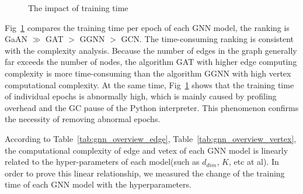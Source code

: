 \begin{figure}
    \caption{The impact of training time}
	\label{fig:exp_absolute_training_time}
\end{figure}

Fig~\ref{fig:exp_absolute_training_time} compares the training time per epoch of each GNN model, the ranking is GaAN $\gg$ GAT $>$ GGNN $>$ GCN.
The time-consuming ranking is consistent with the complexity analysis. Because the number of edges in the graph generally far exceeds the number of nodes, 
the algorithm GAT with higher edge computing complexity is more time-consuming than the algorithm GGNN with high vertex computational complexity. At the same time, 
Fig~\ref{fig:exp_absolute_training_time} shows that the training time of individual epochs is abnormally high, which is mainly caused by profiling overhead and the GC pause of the Python interpreter.
This phenomenon confirms the necessity of removing abnormal epochs.

According to Table~\ref{tab:gnn_overview_edge}, Table~\ref{tab:gnn_overview_vertex}, the computational complexity of edge and vetex of each GNN model is linearly related to the 
hyper-parameters of each model(such as $d_{dim}$, $K$, etc at al). In order to prove this linear relationship, we measured the change of the training time of each GNN model with the hyperparameters.

